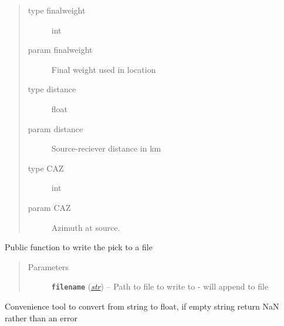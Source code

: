 \documentclass[a4paper,10pt,english]{sphinxmanual}
\begin{document}
\begin{fulllineitems}
\begin{description}
\begin{quote}
\begin{description}
\item[{type finalweight}] \leavevmode
int

\item[{param finalweight}] \leavevmode
Final weight used in location

\item[{type distance}] \leavevmode
float

\item[{param distance}] \leavevmode
Source-reciever distance in km

\item[{type CAZ}] \leavevmode
int

\item[{param CAZ}] \leavevmode
Azimuth at source.

\end{description}\end{quote}

\end{description}

\begin{fulllineitems}
\label{submodules/utils.Sfile_util:Sfile_util.PICK.write}
Public function to write the pick to a file
\begin{quote}\begin{description}
\item[{Parameters}] \leavevmode
\textbf{\texttt{filename}} (\href{https://docs.python.org/library/functions.html\#str}{\emph{str}}) -- Path to file to write to - will append to file

\end{description}\end{quote}

\end{fulllineitems}


\end{fulllineitems}


\begin{fulllineitems}
\label{submodules/utils.Sfile_util:Sfile_util._float_conv}
Convenience tool to convert from string to float, if empty string return
NaN rather than an error

\end{fulllineitems}

\end{document}
